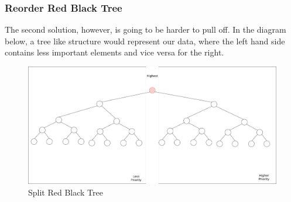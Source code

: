 \documentclass{article}
\begin{document}
\subsubsection{Reorder Red Black Tree}

The second solution, however, is going to be harder to pull off.
In the diagram below, a tree like structure would represent our data, where the left hand side contains less important elements and vice versa for the right.

\begin{figure}[!h]
\centering
\includegraphics[width=13cm]{RedBlack}
\caption{Split Red Black Tree}
\end{figure}
\end{document}

